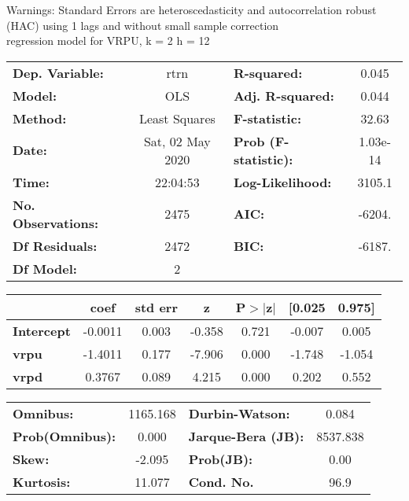 Warnings: \newline
 [1] Standard Errors are heteroscedasticity and autocorrelation robust (HAC) using 1 lags and without small sample correction\\ 

regression model for VRPU, k = 2 h = 12\begin{center}
\begin{tabular}{lclc}
\toprule
\textbf{Dep. Variable:}    &       rtrn       & \textbf{  R-squared:         } &     0.045   \\
\textbf{Model:}            &       OLS        & \textbf{  Adj. R-squared:    } &     0.044   \\
\textbf{Method:}           &  Least Squares   & \textbf{  F-statistic:       } &     32.63   \\
\textbf{Date:}             & Sat, 02 May 2020 & \textbf{  Prob (F-statistic):} &  1.03e-14   \\
\textbf{Time:}             &     22:04:53     & \textbf{  Log-Likelihood:    } &    3105.1   \\
\textbf{No. Observations:} &        2475      & \textbf{  AIC:               } &    -6204.   \\
\textbf{Df Residuals:}     &        2472      & \textbf{  BIC:               } &    -6187.   \\
\textbf{Df Model:}         &           2      & \textbf{                     } &             \\
\bottomrule
\end{tabular}
\begin{tabular}{lcccccc}
                   & \textbf{coef} & \textbf{std err} & \textbf{z} & \textbf{P$> |$z$|$} & \textbf{[0.025} & \textbf{0.975]}  \\
\midrule
\textbf{Intercept} &      -0.0011  &        0.003     &    -0.358  &         0.721        &       -0.007    &        0.005     \\
\textbf{vrpu}      &      -1.4011  &        0.177     &    -7.906  &         0.000        &       -1.748    &       -1.054     \\
\textbf{vrpd}      &       0.3767  &        0.089     &     4.215  &         0.000        &        0.202    &        0.552     \\
\bottomrule
\end{tabular}
\begin{tabular}{lclc}
\textbf{Omnibus:}       & 1165.168 & \textbf{  Durbin-Watson:     } &    0.084  \\
\textbf{Prob(Omnibus):} &   0.000  & \textbf{  Jarque-Bera (JB):  } & 8537.838  \\
\textbf{Skew:}          &  -2.095  & \textbf{  Prob(JB):          } &     0.00  \\
\textbf{Kurtosis:}      &  11.077  & \textbf{  Cond. No.          } &     96.9  \\
\bottomrule
\end{tabular}
\end{center}

